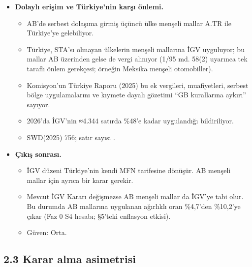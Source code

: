 \begin{itemize}
\tightlist
\item
  \textbf{Dolaylı erişim ve Türkiye'nin karşı önlemi.}

  \begin{itemize}
  \tightlist
  \item
    AB'de serbest dolaşıma girmiş üçüncü ülke menşeli mallar A.TR ile Türkiye'ye gelebiliyor.
  \item
    Türkiye, STA'sı olmayan ülkelerin menşeli mallarına İGV uyguluyor; bu mallar AB üzerinden gelse de vergi alınıyor (1/95 md. 58(2) uyarınca tek taraflı önlem gerekçesi; örneğin Meksika menşeli otomobiller).
  \item
    Komisyon'un Türkiye Raporu (2025) bu ek vergileri, muafiyetleri, serbest bölge uygulamalarını ve kıymete dayalı gözetimi ``GB kurallarına aykırı'' sayıyor.
  \item
    2026'da İGV'nin ≈4.344 satırda \%48'e kadar uygulandığı bildiriliyor.
  \item
    \etiketV{} SWD(2025) 756; satır sayısı \etiketD{}.
  \end{itemize}
\item
  \textbf{Çıkış sonrası.}

  \begin{itemize}
  \tightlist
  \item
    İGV düzeni Türkiye'nin kendi MFN tarifesine dönüşür. AB menşeli mallar için ayrıca bir karar gerekir.
  \item
    Mevcut İGV Kararı değişmezse AB menşeli mallar da İGV'ye tabi olur. Bu durumda AB mallarına uygulanan ağırlıklı oran \%4,7'den \%10,2'ye çıkar (Faz 0 S4 hesabı; §5'teki enflasyon etkisi).
  \item
    \etiketT{} Güven: Orta.
  \end{itemize}
\end{itemize}

\hypertarget{01_teshis-23-karar-alma-asimetrisi}{%
\subsection{2.3 Karar alma asimetrisi}\label{01_teshis-23-karar-alma-asimetrisi}}


